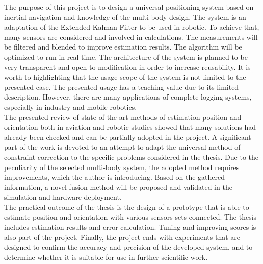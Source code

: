 The purpose of this project is to design a universal positioning system based on inertial navigation and knowledge of the multi-body design. The system is an adaptation of the Extended Kalman Filter to be used in robotic. To achieve that, many sensors are considered and involved in calculations. The measurements will be filtered and blended to improve estimation results. The algorithm will be optimized to run in real time. The architecture of the system is planned to be very transparent and open to modification in order to increase reusability. It is worth to highlighting that the usage scope of the system is not limited to the presented case. The presented usage has a teaching value due to its limited description. However, there are many applications of complete logging systems, especially in industry and mobile robotics.\\

The presented review of state-of-the-art methods of estimation position and orientation both in aviation and robotic studies showed that many solutions had already been checked and can be partially adopted in the project. A significant part of the work is devoted to an attempt to adapt the universal method of constraint correction to the specific problems considered in the thesis. Due to the peculiarity of the selected multi-body system, the adopted method requires improvements, which the author is introducing. Based on the gathered information, a novel fusion method will be proposed and validated in the simulation and hardware deployment.\\

The practical outcome of the thesis is the design of a prototype that is able to estimate position and orientation with various sensors sets connected. The thesis includes estimation results and error calculation. Tuning and improving scores is also part of the project. Finally, the project ends with experiments that are designed to confirm the accuracy and precision of the developed system, and to determine whether it is suitable for use in further scientific work. 